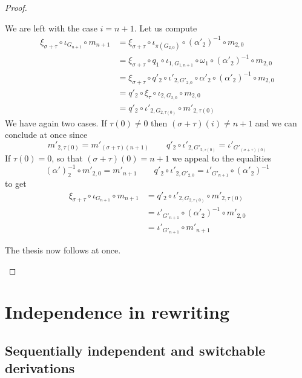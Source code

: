 \begin{proof}
\begin{itemize}
\begin{itemize}
	We are left with the case $i=n+1$. Let us compute
	\begin{align*}
		\xi_{\sigma+\tau}\circ \iota_{G_{n+1}} \circ m_{n+1} &= \xi_{\sigma+\tau} \circ \iota_{\pi(G_{2,0})} \circ (\alpha'_2)^{-1}\circ m_{2,0}\\&=\xi_{\sigma+\tau} \circ q_1\circ \iota_{1, G_{1,n+1}} \circ \omega_1 \circ (\alpha'_2)^{-1}\circ m_{2,0}\\&=\xi_{\sigma+\tau} \circ q'_2 \circ \iota'_{2,G'_{2,0}} \circ \alpha'_2 \circ (\alpha'_2)^{-1}\circ m_{2,0} \\&=q'_2 \circ \xi_\tau \circ \iota_{2, G_{2,0}} \circ m_{2,0}\\&=q'_2\circ \iota'_{2, G_{2,\tau(0)}} \circ m'_{2,\tau(0)}
	\end{align*}
	We have again two cases. If $\tau(0)\neq 0$ then $(\sigma+\tau)(i)\neq n+1$ and we can conclude at once since 
	\[m'_{2, \tau(0)}=m'_{(\sigma+\tau)(n+1)} \qquad q'_2\circ \iota'_{2, G'_{2,\tau(0)}}=
	\iota'_{G'_{(\sigma+\tau)(0)}}\] 
	If $\tau(0)=0$, so that  $(\sigma+\tau)(0)= n+1$ we appeal to the equalities
	\[(\alpha')^{-1}_2\circ m'_{2, 0}=m'_{n+1} \qquad q'_2\circ \iota'_{2, G'_{2, 0}}=
	\iota'_{G'_{n+1}}\circ (\alpha'_2)^{-1}\] 
	to get
	\begin{align*}
		\xi_{\sigma+\tau}\circ \iota_{G_{n+1}} \circ m_{n+1} &= q'_2\circ \iota'_{2, G_{2,\tau(0)}} \circ m'_{2,\tau(0)}\\&=	\iota'_{G'_{n+1}}\circ (\alpha'_2)^{-1}\circ m'_{2,0}\\&=\iota'_{G'_{n+1}}\circ  m'_{n+1}
	\end{align*}
\end{itemize}
The thesis now follows at once.	 \qedhere 
\end{itemize} \end{proof}








\section{Independence in rewriting}


\subsection{Sequentially independent and switchable derivations }

